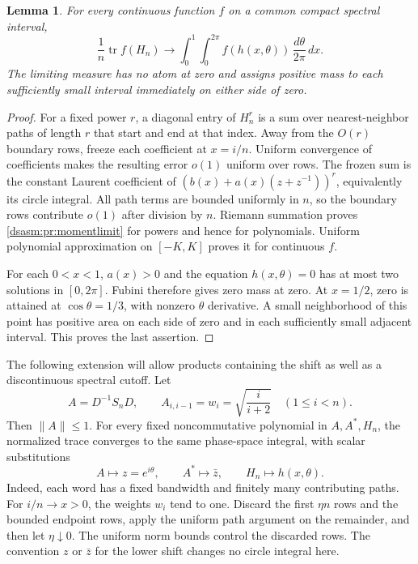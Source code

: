 \documentclass[11pt,letterpaper]{article}
\newtheorem{lemma}[theorem]{Lemma}
\theoremstyle{remark}\newtheorem{remark}[theorem]{Remark}
\DeclareMathOperator{\tr}{tr}\DeclareMathOperator{\Ran}{Ran}
\begin{document}
\begin{lemma}\label{dsasm:pr:momentlemma}
For every continuous function $f$ on a common compact spectral
interval,
\begin{equation}\label{dsasm:pr:momentlimit}
 \frac1n\tr f(H_n)\longrightarrow
 \int_0^1\int_0^{2\pi}f(h(x,\theta))\,\frac{d\theta}{2\pi}\,dx.
\end{equation}
The limiting measure has no atom at zero and assigns positive mass
to each sufficiently small interval immediately on either side of zero.
\end{lemma}
\begin{proof}
For a fixed power $r$, a diagonal entry of $H_n^r$ is a sum over
nearest-neighbor paths of length $r$ that start and end at that index.
Away from the $O(r)$ boundary rows, freeze each coefficient at $x=i/n$.
Uniform convergence of coefficients makes the resulting error $o(1)$
uniform over rows. The frozen sum is the constant Laurent coefficient
of $(b(x)+a(x)(z+z^{-1}))^r$, equivalently its circle integral.
All path terms are bounded uniformly in $n$, so the boundary rows
contribute $o(1)$ after division by $n$. Riemann summation proves
\eqref{dsasm:pr:momentlimit} for powers and hence for polynomials. Uniform
polynomial approximation on $[-K,K]$ proves it for continuous $f$.

For each $0<x<1$, $a(x)>0$ and the equation $h(x,\theta)=0$ has at
most two solutions in $[0,2\pi]$. Fubini therefore gives zero mass at
zero. At $x=1/2$, zero is attained at $\cos\theta=1/3$, with nonzero
$\theta$ derivative. A small neighborhood of this point has positive
area on each side of zero and in each sufficiently small adjacent
interval. This proves the last assertion.
\end{proof}

The following extension will allow products containing the shift as
well as a discontinuous spectral cutoff. Let
\begin{equation}\label{dsasm:pr:weightedshift}
 A=D^{-1}S_nD,
 \qquad A_{i,i-1}=w_i=\sqrt{\frac{i}{i+2}}\quad(1\le i<n).
\end{equation}
Then $\|A\|\le1$. For every fixed noncommutative polynomial in
$A,A^*,H_n$, the normalized trace converges to the same phase-space
integral, with scalar substitutions
\begin{equation}\label{dsasm:pr:mixedsymbol}
 A\mapsto z=e^{i\theta},\qquad A^*\mapsto\bar z,\qquad
 H_n\mapsto h(x,\theta).
\end{equation}
Indeed, each word has a fixed bandwidth and finitely many contributing
paths. For $i/n\to x>0$, the weights $w_i$ tend to one. Discard the
first $\eta n$ rows and the bounded endpoint rows, apply the uniform
path argument on the remainder, and then let $\eta\downarrow0$.
The uniform norm bounds control the discarded rows. The convention
$z$ or $\bar z$ for the lower shift changes no circle integral here.
\end{document}
